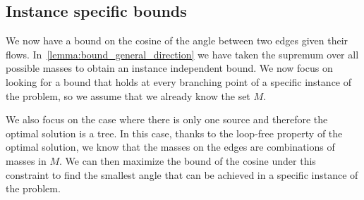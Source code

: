 \documentclass[11pt,reqno,a4paper]{amsart}
\numberwithin{equation}{section}
\theoremstyle{mytheorem}
\theoremstyle{myremark}
\theoremstyle{myparagraph}
\begin{document}
    \subsection{Instance specific bounds}

    We now have a bound on the cosine of the angle between two edges given their flows. In~\ref{lemma:bound_general_direction} we have
    taken the supremum over all possible masses to obtain an instance independent bound.
    We now focus on looking for a bound that holds at every branching point of a specific instance of the problem,
    so we assume that we already know the set $M$.


    We also focus on the case where there is only one source and therefore the optimal solution is a tree.
    In this case, thanks to the loop-free property of the optimal solution, we know that the masses on the edges are
    combinations of masses in $M$. We can then maximize the bound of the cosine under this constraint to find the smallest
    angle that can be achieved in a specific instance of the problem.
\end{document}
